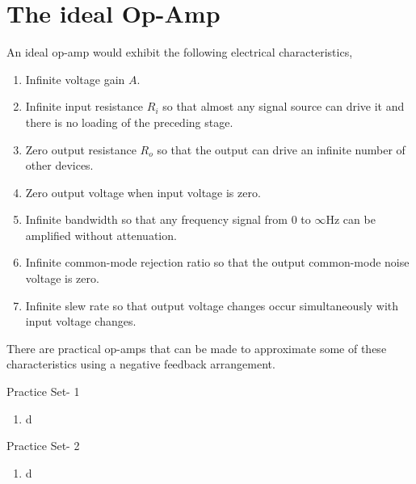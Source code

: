    \section{The ideal Op-Amp} 
   An ideal op-amp would exhibit the following electrical characteristics,
   \begin{enumerate}
   	\item  Infinite voltage gain $A$.
   	\item Infinite input resistance $R_{i}$ so that almost any signal source can drive it and there is no loading of the preceding stage.
   	\item Zero output resistance $R_{o}$ so that the output can drive an infinite number of other devices.
   	\item Zero output voltage when input voltage is zero.
   	\item Infinite bandwidth so that any frequency signal from 0 to $\infty \mathrm{Hz}$ can be amplified without attenuation.
   	\item Infinite common-mode rejection ratio so that the output common-mode noise voltage is zero.
   	\item Infinite slew rate so that output voltage changes occur simultaneously with input voltage changes.
   \end{enumerate}
   There are practical op-amps that can be made to approximate some of these characteristics using a negative feedback arrangement.
   \newpage
   \begin{abox}
   Practice Set- 1
   \end{abox}
\begin{enumerate}
	\item d
\end{enumerate}
     \newpage
  \begin{abox}
  	Practice Set- 2
  \end{abox}
  \begin{enumerate}
  	\item d
  \end{enumerate} 